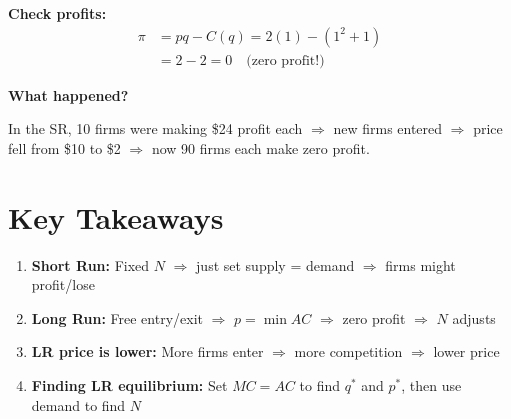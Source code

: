 \documentclass[11pt]{article}
\begin{document}
\textbf{Check profits:}
\begin{align*}
\pi &= pq - C(q) = 2(1) - (1^2 + 1) \\
&= 2 - 2 = 0 \quad \text{(zero profit!)}
\end{align*}

\begin{tcolorbox}[colback=boxgreen, colframe=green!50!black]
\textbf{What happened?}

In the SR, 10 firms were making \$24 profit each $\Rightarrow$ new firms entered $\Rightarrow$ price fell from \$10 to \$2 $\Rightarrow$ now 90 firms each make zero profit.
\end{tcolorbox}

\section{Key Takeaways}

\begin{enumerate}[leftmargin=*]
    \item \textbf{Short Run:} Fixed $N$ $\Rightarrow$ just set supply = demand $\Rightarrow$ firms might profit/lose

    \item \textbf{Long Run:} Free entry/exit $\Rightarrow$ $p = \min AC$ $\Rightarrow$ zero profit $\Rightarrow$ $N$ adjusts

    \item \textbf{LR price is lower:} More firms enter $\Rightarrow$ more competition $\Rightarrow$ lower price

    \item \textbf{Finding LR equilibrium:} Set $MC = AC$ to find $q^*$ and $p^*$, then use demand to find $N$
\end{enumerate}
\end{document}
